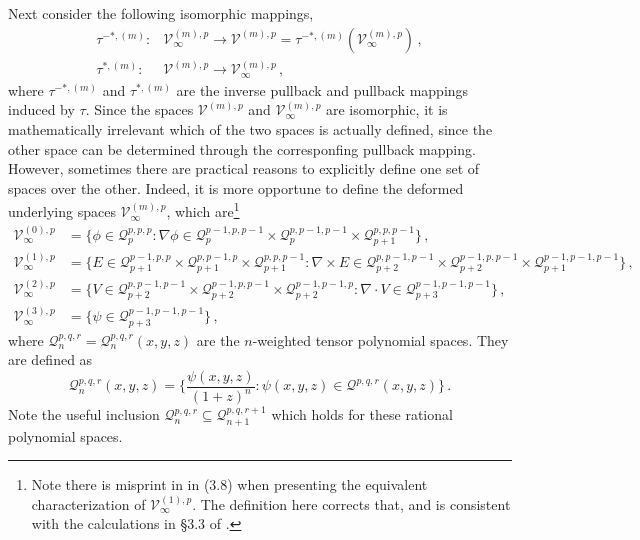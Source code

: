 Next consider the following isomorphic mappings,
\begin{equation}
\begin{aligned}
	\tau^{-*,(m)}:&\mathcal{V}_\infty^{(m),p}\longrightarrow\mathcal{V}^{(m),p}=\tau^{-*,(m)}(\mathcal{V}_\infty^{(m),p})\,,\\
		\tau^{*,(m)}:&\mathcal{V}^{(m),p}\longrightarrow\mathcal{V}_\infty^{(m),p}\,,
\end{aligned}
\end{equation}
where $\tau^{-*,(m)}$ and $\tau^{*,(m)}$ are the inverse pullback and pullback mappings induced by $\tau$.
Since the spaces $\mathcal{V}^{(m),p}$ and $\mathcal{V}_\infty^{(m),p}$ are isomorphic, it is mathematically irrelevant which of the two spaces is actually defined, since the other space can be determined through the corresponfing pullback mapping.
However, sometimes there are practical reasons to explicitly define one set of spaces over the other.
Indeed, it is more opportune to define the deformed underlying spaces $\mathcal{V}_\infty^{(m),p}$, which are\footnote{Note there is misprint in \citet{Nigam_Phillips_11} in (3.8) when presenting the equivalent characterization of $\mathcal{V}_\infty^{(1),p}$. The definition here corrects that, and is consistent with the calculations in \S3.3 of \citet{Nigam_Phillips_11}.}
\begin{equation}
\begin{aligned}
	\mathcal{V}_\infty^{(0),p}&=\{\phi\!\in\!\mathcal{Q}_p^{p,p,p}:
		\nabla\phi\!\in\!\mathcal{Q}_p^{p-1,p,p-1}\!\times\!\mathcal{Q}_p^{p,p-1,p-1}\!\times\!\mathcal{Q}_{p+1}^{p,p,p-1}\}\,,\\
	\mathcal{V}_\infty^{(1),p}&=\{E\!\in\!
		\mathcal{Q}_{p+1}^{p-1,p,p}\!\times\!\mathcal{Q}_{p+1}^{p,p-1,p}\!\times\!\mathcal{Q}_{p+1}^{p,p,p-1}:
			\nabla\!\times\! E\!\in\!
				\mathcal{Q}_{p+2}^{p,p-1,p-1}\!\times\!\mathcal{Q}_{p+2}^{p-1,p,p-1}\!\times\!\mathcal{Q}_{p+1}^{p-1,p-1,p-1}\}\,,\\
	\mathcal{V}_\infty^{(2),p}&=\{V\!\in\!
		\mathcal{Q}_{p+2}^{p,p-1,p-1}\!\times\!\mathcal{Q}_{p+2}^{p-1,p,p-1}\!\times\!\mathcal{Q}_{p+2}^{p-1,p-1,p}:
			\nabla\cdot V\!\in\!\mathcal{Q}_{p+3}^{p-1,p-1,p-1}\}\,,\\
	\mathcal{V}_\infty^{(3),p}&=\{\psi\!\in\!\mathcal{Q}_{p+3}^{p-1,p-1,p-1}\}\,,
\end{aligned}
\end{equation}
where $\mathcal{Q}_{n}^{p,q,r}=\mathcal{Q}_{n}^{p,q,r}(x,y,z)$ are the $n$-weighted tensor polynomial spaces. 
They are defined as
\begin{equation}
	\mathcal{Q}_{n}^{p,q,r}(x,y,z)
		=\Big\{\frac{\psi(x,y,z)}{(1+z)^n}:\psi(x,y,z)\in\mathcal{Q}^{p,q,r}(x,y,z)\Big\}\,.
\end{equation}
Note the useful inclusion $\mathcal{Q}_{n}^{p,q,r}\subseteq\mathcal{Q}_{n+1}^{p,q,r+1}$ which holds for these rational polynomial spaces.

